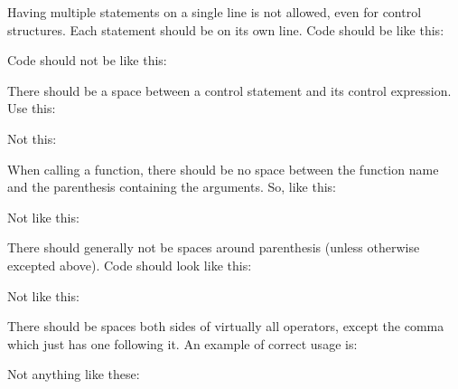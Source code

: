 \begin{DoxyItemize}
\item Having multiple statements on a single line is not allowed, even for control structures. Each statement should be on its own line. Code should be like this\+: 
\begin{DoxyCode}{0}
\DoxyCodeLine{}
\end{DoxyCode}
 Code should not be like this\+: 
\begin{DoxyCode}{0}
\DoxyCodeLine{}
\end{DoxyCode}

\item There should be a space between a control statement and its control expression. Use this\+: 
\begin{DoxyCode}{0}
\end{DoxyCode}
 Not this\+: 
\begin{DoxyCode}{0}
\end{DoxyCode}

\item When calling a function, there should be no space between the function name and the parenthesis containing the arguments. So, like this\+: 
\begin{DoxyCode}{0}
\end{DoxyCode}
 Not like this\+: 
\begin{DoxyCode}{0}
\end{DoxyCode}

\item There should generally not be spaces around parenthesis (unless otherwise excepted above). Code should look like this\+: 
\begin{DoxyCode}{0}
\end{DoxyCode}
 Not like this\+: 
\begin{DoxyCode}{0}
\end{DoxyCode}

\item There should be spaces both sides of virtually all operators, except the comma which just has one following it. An example of correct usage is\+: 
\begin{DoxyCode}{0}
\end{DoxyCode}
 Not anything like these\+: 
\begin{DoxyCode}{0}
\end{DoxyCode}


\end{DoxyItemize}
